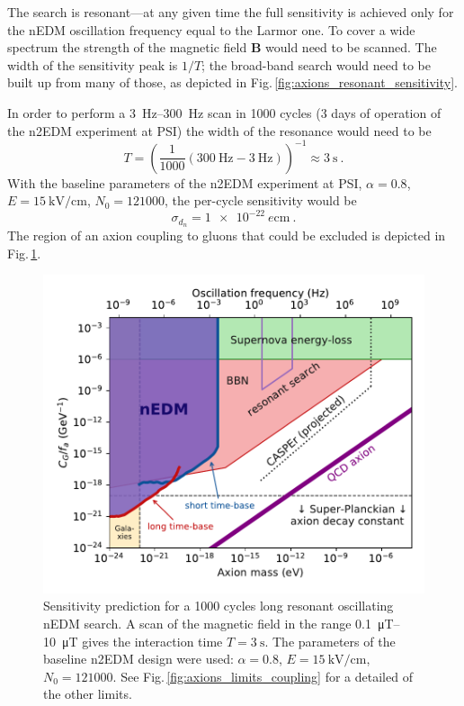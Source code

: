The search is resonant---at any given time the full sensitivity is achieved only for the nEDM oscillation frequency equal to the Larmor one.
To cover a wide spectrum the strength of the magnetic field $\mathbf{B}$ would need to be scanned.
The width of the sensitivity peak is $1/T$; the broad-band search would need to be built up from many of those, as depicted in Fig.\,\ref{fig:axions_resonant_sensitivity}.

In order to perform a \SIrange[range-phrase=--]{3}{300}{\hertz} scan in 1000 cycles (3 days of operation of the n2EDM experiment at PSI) the width of the resonance would need to be
\begin{equation}
  T = {\left( \frac{1}{1000} \left( \SI{300}{\hertz} - \SI{3}{\hertz} \right)  \right)}^{-1} \approx \SI{3}{\second} \ .
\end{equation}
With the baseline parameters of the n2EDM experiment at PSI, $\alpha = 0.8$, $E = \SI{15}{\kilo\volt\per\centi\metre}$, $N_0 = \num{121000}$, the per-cycle sensitivity would be 
\begin{equation}
  \sigma_{d_n} = \SI{1e-22}{\elementarycharge\centi\metre} \ .
\end{equation}
The region of an axion coupling to gluons that could be excluded is depicted in Fig.\,\ref{fig:axions_prediction}.

\begin{figure}
  \centering
  \includegraphics[width=\linewidth]{gfx/axions/resonant_search_exclusion_1000cycles_n2EDM.pdf}
  \caption{Sensitivity prediction for a 1000 cycles long resonant oscillating nEDM search. A scan of the magnetic field in the range \SIrange[range-phrase=--]{0.1}{10}{\micro\tesla} gives the interaction time $T = \SI{3}{\second}$. The parameters of the baseline n2EDM design were used: $\alpha = 0.8$, $E = \SI{15}{\kilo\volt\per\centi\metre}$, $N_0 = \num{121000}$. See Fig.\,\ref{fig:axions_limits_coupling} for a detailed of the other limits.}\label{fig:axions_prediction}
\end{figure}

